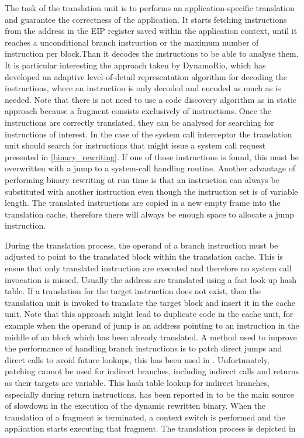 The task of the translation unit is to performs an application-specific translation and guarantee the correctness of the application. It starts fetching instructions from the address in the EIP register saved within the application context, until it reaches a  unconditional branch instruction or the maximum number of instruction per block.Than it decodes the instructions to be able to analyse them. It is particular interesting the approach taken by DynamoRio, which has developed an adaptive level-of-detail representation algorithm for decoding the instructions, where an instruction is only decoded and encoded as much as is needed. Note that there is not need to use a code discovery algorithm as in static approach because a fragment consists exclusively of instructions. Once the instructions are correctly translated,  they can be analysed for searching for instructions of interest. In the case of the system call interceptor the translation unit should search for instructions that might issue a system call request presented in \ref{binary_rewriting}. If one of those instructions is found, this must be overwritten with a jump to a system-call handling routine. Another advantage of performing binary rewriting at run time is that an instruction can always be substituted with another instruction even though the instruction set is of variable length. The translated instructions are copied in a new empty frame into the translation cache, therefore  there will always be enough space to allocate a jump instruction.   

During the translation process, the operand of a branch instruction must be adjusted to point to the translated block within the translation cache. This is ensue that only translated instruction are executed and therefore no system call invocation is missed. Usually the address are translated using a fast look-up hash table. 
If a translation for the target instruction does not exist, then the translation unit is invoked to translate the target block and insert it in the cache unit. Note that this approach might lead to duplicate code in the cache unit, for example when the operand of jump is an address pointing to an instruction in the middle of an block which has been already translated. A method used to improve the performance of handling branch instructions is to patch direct jumps and direct calls to avoid future lookups, this has been used in \cite{vx32, DynamoRio}. Unfortunately, patching cannot be used for indirect branches, including indirect calls and returns as their targets are variable. This hash table lookup for indirect branches, especially during return instructions, has been reported in \cite{vx32} to be the main source of slowdown in the execution of the dynamic rewritten binary. When the translation of a fragment is terminated, a context switch is performed and the application starts executing that fragment. The translation process is depicted in 


